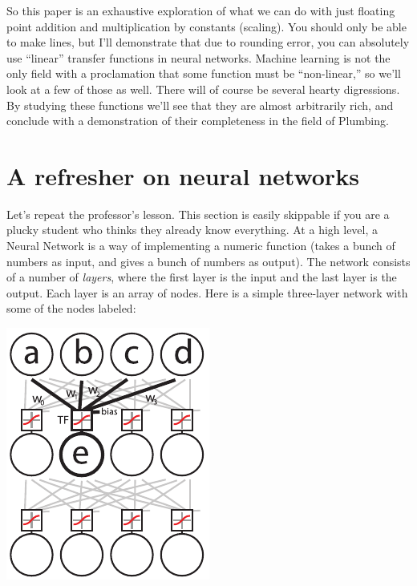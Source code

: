 \documentclass[twocolumn]{article}
\begin{document}
So this paper is an exhaustive exploration of what we can do with just
floating point addition and multiplication by constants (scaling). You
should only be able to make lines, but I'll demonstrate that due to
rounding error, you can absolutely use ``linear'' transfer functions
in neural networks. Machine learning is not the only field with a
proclamation that some function must be ``non-linear,'' so we'll look
at a few of those as well. There will of course be several hearty
digressions. By studying these functions we'll see that they are
almost arbitrarily rich, and conclude with a demonstration of their
completeness in the field of Plumbing.

\section{A refresher on neural networks}
Let's repeat the professor's lesson. This section is easily skippable
if you are a plucky student who thinks they already know everything.
At a high level, a Neural Network is a way of implementing a numeric function
(takes a bunch of numbers as input, and gives a bunch of numbers as
output). The network consists of a number of {\it layers}, where the
first layer is the input and the last layer is the output. Each layer
is an array of nodes. Here is a simple three-layer network with some
of the nodes labeled:

\begin{center}
\includegraphics[width=0.65 \linewidth]{neural-network}
\end{center}
\end{document}
